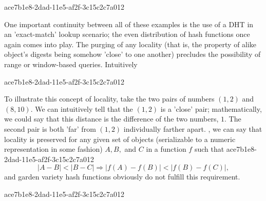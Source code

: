 \documentclass[12pt]{article}
\begin{document}
ace7b1e8-2dad-11e5-af2f-3c15c2c7a012\par One important continuity between all of these examples is the use of a DHT in an 'exact-match' lookup scenario; the even distribution of hash functions once again comes into play. The purging of any locality (that is, the property of alike object's digests being somehow 'close' to one another) precludes the possibility of range or window-based queries. Intuitively

ace7b1e8-2dad-11e5-af2f-3c15c2c7a012\par To illustrate this concept of locality, take the two pairs of numbers $(1,2)$ and $(8,10)$. We can intuitively tell that the $(1,2)$ is a 'close' pair; mathematically, we could say that this distance is the difference of the two numbers, $1$. The second pair is both 'far' from $(1,2)$ individually farther apart. , we can say that locality is preserved for any given set of objects (serializable to a numeric representation in some fashion) $A,B,$ and $C$ in a function $f$ such that
ace7b1e8-2dad-11e5-af2f-3c15c2c7a012\begin{equation}
|A-B| < |B-C| \Rightarrow |f(A)-f(B)| < |f(B) - f(C)|,
\end{equation}
and garden variety hash functions obviously do not fulfill this requirement.

\printbibliography
ace7b1e8-2dad-11e5-af2f-3c15c2c7a012
\end{document}
